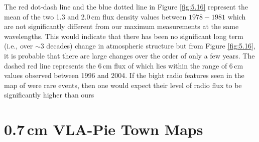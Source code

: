 The red dot-dash line and the blue dotted line in Figure \ref{fig:5.16} represent the mean of the two 1.3 and 2.0\,cm flux density values between $1978-1981$  \citep{newell_1982} which are not significantly different from our maximum measurements at the same wavelengths. This would indicate that there has been no significant long term (i.e., over $\sim 3$ decades) change in atmospheric structure but from Figure \ref{fig:5.16}, it is probable that there are large changes over the order of only a few years. The dashed red line represents the 6\,cm flux of \cite{richards_2013} which lies within the range of 6\,cm values observed between 1996 and 2004. If the bight radio features seen in the map of \cite{richards_2013} were rare events, then one would expect their level of radio flux to be significantly higher than ours 

\section{0.7\,cm VLA-Pie Town Maps}\label{sec:5.15}

